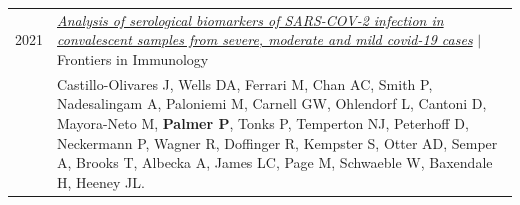 \documentclass[letterpaper,11pt]{article}
\begin{document}
\begin{tabularx}{\linewidth}{@{}p{2cm}@{\hspace{5pt}}|@{\hspace{5pt}}X@{}}
    2021 & 
    \textit{\href{https://doi.org/10.3389/fimmu.2021.748291}{\color{teal}Analysis of serological biomarkers of SARS-COV-2 infection in convalescent samples from severe, moderate and mild covid-19 cases}} $|$ Frontiers in Immunology \\
    & Castillo-Olivares J, Wells DA, Ferrari M, Chan AC, Smith P, Nadesalingam A, Paloniemi M, Carnell GW, Ohlendorf L, Cantoni D, Mayora-Neto M, \textbf{Palmer P}, Tonks P, Temperton NJ, Peterhoff D, Neckermann P, Wagner R, Doffinger R, Kempster S, Otter AD, Semper A, Brooks T, Albecka A, James LC, Page M, Schwaeble W, Baxendale H, Heeney JL. \\
\end{tabularx}




\end{document}
